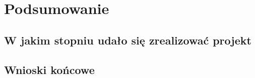 \chapter{Podsumowanie}
\label{c7:c7}

\section{W jakim stopniu udało się zrealizować projekt}
\section{Wnioski końcowe}